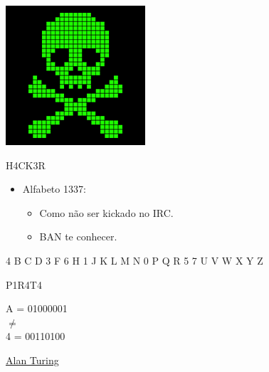 {

\begin{center}
	\includegraphics[width=.7\linewidth]{./IMG-GIT/digital-pirate-thumbnail-black.png}
\end{center}

	\begin{center}
	{\Huge H4CK3R}
\end{center}
\vfill\null
\columnbreak

\huge
\begin{itemize}
	\item Alfabeto 1337:
	
	\LARGE
	\begin{itemize}
		\item Como não ser kickado no IRC.
		\item BAN te conhecer.
	\end{itemize}
\end{itemize}

\begin{center}
	\Huge 4 B C D 3 F 6 H 1 J K L M N 0 P Q R 5 7 U V W X Y Z
	
	\vfill\null
	\columnbreak
		
	{\LARGE	
		\vspace*{20mm}
		P1R4T4
		
		A = 01000001\\$ \neq $\\4 = 00110100
	}
\end{center}
}
\vfill\null
\columnbreak


\huge

 \href{https://en.wikipedia.org/wiki/Alan_Turing}{Alan Turing}

